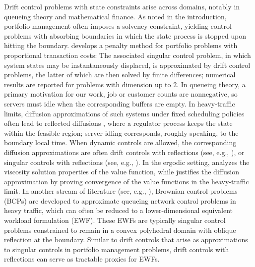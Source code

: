 \documentclass[11pt]{article}
\theoremstyle{definition}
\theoremstyle{plain}
\begin{document}
Drift control problems with state constraints arise across domains, notably in queueing theory and mathematical finance. 
As noted in the introduction, portfolio management often imposes a solvency constraint, 
yielding control problems with absorbing boundaries in which the state process is stopped upon hitting the boundary. 
\cite{DaiZhong2010} develops a penalty method for portfolio problems with proportional transaction costs: 
The associated singular control problem, in which system states may be instantaneously displaced, is approximated
by drift control problems, the latter of which are then solved by finite differences; 
numerical results are reported for problems with dimension up to $2$. 
In queueing theory, a primary motivation for our work, job or customer counts are nonnegative, 
so servers must idle when the corresponding buffers are empty. 
In heavy-traffic limits, diffusion approximations of such systems under fixed scheduling policies often lead to reflected diffusions \cite{Reiman1984,ChenYao2001,Williams1998}, 
where a regulator process keeps the state within the feasible region; 
server idling corresponds, roughly speaking, to the boundary local time. 
When dynamic controls are allowed, the corresponding diffusion approximations are often drift controls with reflections (see, e.g., \cite{budhiraja2011ergodic, borkar2004ergodic}), 
or singular controls with reflections (see, e.g., \cite{atar2006singular,PesicWilliams2016,HarrisonVanMieghem1997,Harrison2000,Harrison2006Corr}). 
In the ergodic setting, \cite{borkar2004ergodic} analyzes the viscosity solution properties of the value function, 
while \cite{budhiraja2011ergodic} justifies the diffusion approximation by proving convergence of the value functions in the heavy-traffic limit. 
In another stream of literature (see, e.g., \cite{HarrisonVanMieghem1997,Harrison2000,Harrison2006Corr}), 
Brownian control problems (BCPs) are developed to approximate queueing network control problems in heavy traffic, 
which can often be reduced to a lower-dimensional equivalent workload formulation (EWF). 
These EWFs are typically singular control problems constrained to remain in a convex polyhedral domain with oblique reflection at the boundary. 
Similar to drift controls that arise as approximations to singular controls in portfolio management problems, 
drift controls with reflections can serve as tractable proxies for EWFs. 
\end{document}
